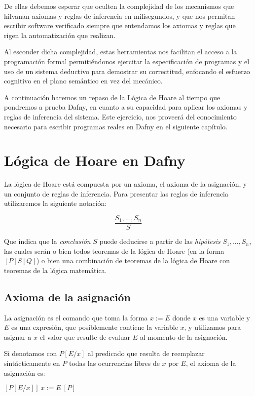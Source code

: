\documentclass[12pt, a4paper, openany, fleqn]{book}
\newcommand{\hoare}[3]{\ensuremath{[#1]\ #2\ [#3]}}
\newcommand{\inferenceRule}[2]{
    \begin{equation*}
        \frac{#1}{#2}
    \end{equation*}
}
\begin{document}
    De ellas debemos esperar que oculten la complejidad de los mecanismos que hilvanan axiomas y reglas de inferencia en milisegundos, y que nos permitan escribir software verificado siempre que entendamos los axiomas y reglas que rigen la automatización que realizan.

    Al esconder dicha complejidad, estas herramientas nos facilitan el acceso a la programación formal permitiéndonos ejercitar la especificación de programas y el uso de un sistema deductivo para demostrar su correctitud, enfocando el esfuerzo cognitivo en el plano semántico en vez del mecánico.

    A continuación haremos un repaso de la Lógica de Hoare al tiempo que pondremos a prueba Dafny, en cuanto a su capacidad para aplicar los axiomas y reglas de inferencia del sistema. Este ejercicio, nos proveerá del conocimiento necesario para escribir programas reales en Dafny en el siguiente capítulo.

    \section{Lógica de Hoare en Dafny}
    La lógica de Hoare está compuesta por un axioma, el axioma de la asignación, y un conjunto de reglas de inferencia. Para presentar las reglas de inferencia utilizaremos la siguiente notación:
    \inferenceRule{S_1, ..., S_n}{S}
    Que indica que la \textit{conclusión} $S$ puede deducirse a partir de las \textit{hipótesis} $S_1, ..., S_n$, las cuales serán o bien todos teoremas de la lógica de Hoare (en la forma $[P]S[Q]$) o bien una combinación de teoremas de la lógica de Hoare con teoremas de la lógica matemática.

    \subsection{Axioma de la asignación}
    La asignación es el comando que toma la forma $x := E$ donde $x$ es una variable y $E$ es una expresión, que posiblemente contiene la variable $x$, y utilizamos para asignar a $x$ el valor que resulte de evaluar $E$ al momento de la asignación.

    Si denotamos con $P[E/x]$ al predicado que resulta de reemplazar sintácticamente en $P$ todas las ocurrencias libres de $x$ por $E$, el axioma de la asignación es:

    \begin{center}
        \hoare{P[E/x]}{x:=E}{P}
    \end{center}
\end{document}
